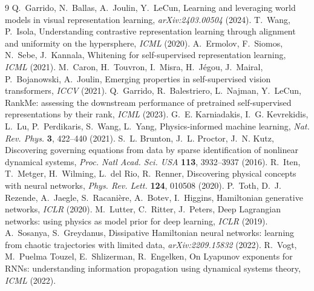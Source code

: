 \documentclass[11pt]{article}
\begin{document}
\begin{thebibliography}{9}
 Q.~Garrido, N.~Ballas, A.~Joulin, Y.~LeCun, Learning and leveraging world models in visual representation learning, \emph{arXiv:2403.00504} (2024).
 T.~Wang, P.~Isola, Understanding contrastive representation learning through alignment and uniformity on the hypersphere, \emph{ICML} (2020).
 A.~Ermolov, F.~Siomos, N.~Sebe, J.~Kannala, Whitening for self-supervised representation learning, \emph{ICML} (2021).
 M.~Caron, H.~Touvron, I.~Misra, H.~J\'egou, J.~Mairal, P.~Bojanowski, A.~Joulin, Emerging properties in self-supervised vision transformers, \emph{ICCV} (2021).
 Q.~Garrido, R.~Balestriero, L.~Najman, Y.~LeCun, RankMe: assessing the downstream performance of pretrained self-supervised representations by their rank, \emph{ICML} (2023).
 G.~E. Karniadakis, I.~G. Kevrekidis, L.~Lu, P.~Perdikaris, S.~Wang, L.~Yang, Physics-informed machine learning, \emph{Nat. Rev. Phys.} \textbf{3}, 422--440 (2021).
 S.~L. Brunton, J.~L. Proctor, J.~N. Kutz, Discovering governing equations from data by sparse identification of nonlinear dynamical systems, \emph{Proc. Natl Acad. Sci. USA} \textbf{113}, 3932--3937 (2016).
 R.~Iten, T.~Metger, H.~Wilming, L.~del Rio, R.~Renner, Discovering physical concepts with neural networks, \emph{Phys. Rev. Lett.} \textbf{124}, 010508 (2020).
 P.~Toth, D.~J. Rezende, A.~Jaegle, S.~Racani\`ere, A.~Botev, I.~Higgins, Hamiltonian generative networks, \emph{ICLR} (2020).
 M.~Lutter, C.~Ritter, J.~Peters, Deep Lagrangian networks: using physics as model prior for deep learning, \emph{ICLR} (2019).
 A.~Sosanya, S.~Greydanus, Dissipative Hamiltonian neural networks: learning from chaotic trajectories with limited data, \emph{arXiv:2209.15832} (2022).
 R.~Vogt, M.~Puelma Touzel, E.~Shlizerman, R.~Engelken, On Lyapunov exponents for RNNs: understanding information propagation using dynamical systems theory, \emph{ICML} (2022).
\end{thebibliography}
\end{document}
